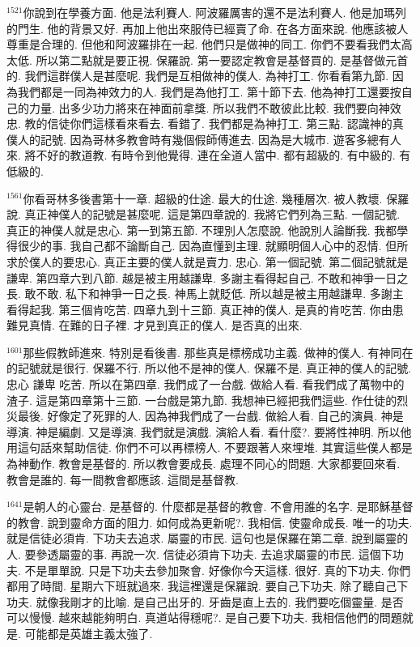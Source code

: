 \documentclass{book}
\begin{document}
$^{1521}$你說到在學養方面.
他是法利賽人.
阿波羅厲害的還不是法利賽人.
他是加瑪列的門生.
他的背景又好.
再加上他出來服侍已經賣了命.
在各方面來說.
他應該被人尊重是合理的.
但他和阿波羅排在一起.
他們只是做神的同工.
你們不要看我們太高太低.
所以第二點就是要正視.
保羅說.
第一要認定教會是基督買的.
是基督做元首的.
我們這群僕人是甚麼呢.
我們是互相做神的僕人.
為神打工.
你看看第九節.
因為我們都是一同為神效力的人.
我們是為他打工.
第十節下去.
他為神打工還要按自己的力量.
出多少功力將來在神面前拿獎.
所以我們不敢彼此比較.
我們要向神效忠.
教的信徒你們這樣看來看去.
看錯了.
我們都是為神打工.
第三點.
認識神的真僕人的記號.
因為哥林多教會時有幾個假師傅進去.
因為是大城市.
遊客多總有人來.
將不好的教道教.
有時令到他覺得.
連在全道人當中.
都有超級的.
有中級的.
有低級的.

$^{1561}$你看哥林多後書第十一章.
超級的仕途.
最大的仕途.
幾種層次.
被人教壞.
保羅說.
真正神僕人的記號是甚麼呢.
這是第四章說的.
我將它們列為三點.
一個記號.
真正的神僕人就是忠心.
第一到第五節.
不理別人怎麼說.
他說別人論斷我.
我都學得很少的事.
我自己都不論斷自己.
因為直懂到主理.
就顯明個人心中的忍情.
但所求於僕人的要忠心.
真正主要的僕人就是賣力.
忠心.
第一個記號.
第二個記號就是謙卑.
第四章六到八節.
越是被主用越謙卑.
多謝主看得起自己.
不敢和神爭一日之長.
敢不敢.
私下和神爭一日之長.
神馬上就貶低.
所以越是被主用越謙卑.
多謝主看得起我.
第三個肯吃苦.
四章九到十三節.
真正神的僕人.
是真的肯吃苦.
你由患難見真情.
在難的日子裡.
才見到真正的僕人.
是否真的出來.

$^{1601}$那些假教師進來.
特別是看後書.
那些真是標榜成功主義.
做神的僕人.
有神同在的記號就是很行.
保羅不行.
所以他不是神的僕人.
保羅不是.
真正神的僕人的記號.
忠心 謙卑 吃苦.
所以在第四章.
我們成了一台戲.
做給人看.
看我們成了萬物中的渣子.
這是第四章第十三節.
一台戲是第九節.
我想神已經把我們這些.
作仕徒的烈災最後.
好像定了死罪的人.
因為神我們成了一台戲.
做給人看.
自己的演員.
神是導演.
神是編劇.
又是導演.
我們就是演戲.
演給人看.
看什麼?.
要將性神明.
所以他用這句話來幫助信徒.
你們不可以再標榜人.
不要跟著人來埋堆.
其實這些僕人都是為神動作.
教會是基督的.
所以教會要成長.
處理不同心的問題.
大家都要回來看.
教會是誰的.
每一間教會都應該.
這間是基督教.

$^{1641}$是朝人的心靈台.
是基督的.
什麼都是基督的教會.
不會用誰的名字.
是耶穌基督的教會.
說到靈命方面的阻力.
如何成為更新呢?.
我相信.
使靈命成長.
唯一的功夫.
就是信徒必須肯.
下功夫去追求.
屬靈的市民.
這句也是保羅在第二章.
說到屬靈的人.
要參透屬靈的事.
再說一次.
信徒必須肯下功夫.
去追求屬靈的市民.
這個下功夫.
不是單單說.
只是下功夫去參加聚會.
好像你今天這樣.
很好.
真的下功夫.
你們都用了時間.
星期六下班就過來.
我這裡還是保羅說.
要自己下功夫.
除了聽自己下功夫.
就像我剛才的比喻.
是自己出牙的.
牙齒是直上去的.
我們要吃個靈量.
是否可以慢慢.
越來越能夠明白.
真道站得穩呢?.
是自己要下功夫.
我相信他們的問題就是.
可能都是英雄主義太強了.
\end{document}

